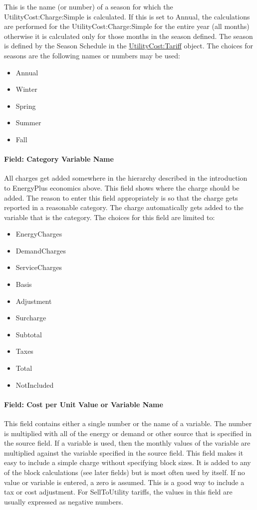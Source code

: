 This is the name (or number) of a season for which the UtilityCost:Charge:Simple is calculated. If this is set to Annual, the calculations are performed for the UtilityCost:Charge:Simple for the entire year (all months) otherwise it is calculated only for those months in the season defined. The season is defined by the Season Schedule in the \hyperref[utilitycosttariff]{UtilityCost:Tariff} object. The choices for seasons are the following names or numbers may be used:

\begin{itemize}
\item
  Annual
\item
  Winter
\item
  Spring
\item
  Summer
\item
  Fall
\end{itemize}

\paragraph{Field: Category Variable Name}\label{field-category-variable-name-000}

All charges get added somewhere in the hierarchy described in the introduction to EnergyPlus economics above. This field shows where the charge should be added. The reason to enter this field appropriately is so that the charge gets reported in a reasonable category. The charge automatically gets added to the variable that is the category. The choices for this field are limited to:

\begin{itemize}
\item
  EnergyCharges
\item
  DemandCharges
\item
  ServiceCharges
\item
  Basis
\item
  Adjustment
\item
  Surcharge
\item
  Subtotal
\item
  Taxes
\item
  Total
\item
  NotIncluded
\end{itemize}

\paragraph{Field: Cost per Unit Value or Variable Name}\label{field-cost-per-unit-value-or-variable-name}

This field contains either a single number or the name of a variable. The number is multiplied with all of the energy or demand or other source that is specified in the source field. If a variable is used, then the monthly values of the variable are multiplied against the variable specified in the source field. This field makes it easy to include a simple charge without specifying block sizes. It is added to any of the block calculations (see later fields) but is most often used by itself. If no value or variable is entered, a zero is assumed. This is a good way to include a tax or cost adjustment. For SellToUtility tariffs, the values in this field are usually expressed as negative numbers.